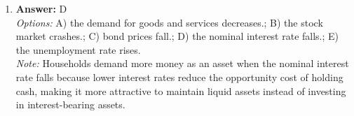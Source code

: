 \documentclass[12pt]{article}
\begin{document}
\begin{enumerate}[label=\arabic*.]
\\ \textit{Note:} A price floor, set above the equilibrium price, leads to a situation where the quantity supplied exceeds the quantity demanded, resulting in a persistent surplus of the good.
\item \textbf{Answer:} D
\\ \textit{Options:} A) the demand for goods and services decreases.; B) the stock market crashes.; C) bond prices fall.; D) the nominal interest rate falls.; E) the unemployment rate rises.
\\ \textit{Note:} Households demand more money as an asset when the nominal interest rate falls because lower interest rates reduce the opportunity cost of holding cash, making it more attractive to maintain liquid assets instead of investing in interest-bearing assets.
\end{enumerate}
\end{document}

